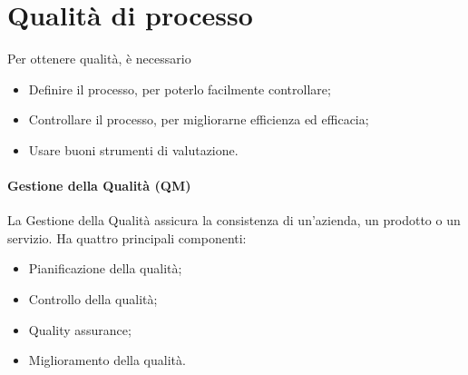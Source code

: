 \section{Qualità di processo}

Per ottenere qualità, è necessario

\begin{itemize}
  \item Definire il processo, per poterlo facilmente controllare;
  \item Controllare il processo, per migliorarne efficienza ed efficacia;
  \item Usare buoni strumenti di valutazione.
\end{itemize}

\paragraph{Gestione della Qualità (QM)}
\label{par:gestione_della_qualit_}

La Gestione della Qualità assicura la consistenza di un'azienda, un prodotto o
un servizio. Ha quattro principali componenti:

\begin{itemize}
  \item Pianificazione della qualità;
  \item Controllo della qualità;
  \item Quality assurance;
  \item Miglioramento della qualità.
\end{itemize}

